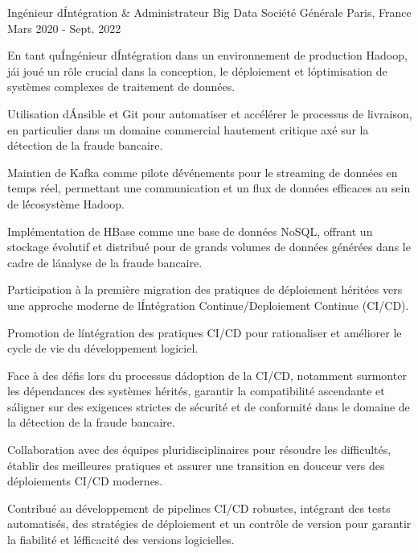 \begin{cventries}
  \cventry
    {Ingénieur d\' Intégration \& Administrateur Big Data} %
    {Société Générale} %
    {Paris, France} %
    {Mars 2020 - Sept. 2022} %
    {
      \begin{cvitems} %
        \item {En tant qu\' Ingénieur d\' Intégration dans un environnement de production Hadoop, j\' ai joué un rôle crucial dans la conception, le déploiement et l\' optimisation de systèmes complexes de traitement de données.}
        \item {Utilisation d\' Ansible et Git pour automatiser et accélérer le processus de livraison, en particulier dans un domaine commercial hautement critique axé sur la détection de la fraude bancaire.}
        \item {Maintien de Kafka comme pilote d\' événements pour le streaming de données en temps réel, permettant une communication et un flux de données efficaces au sein de l\' écosystème Hadoop.}
        \item {Implémentation de HBase comme une base de données NoSQL, offrant un stockage évolutif et distribué pour de grands volumes de données générées dans le cadre de l\' analyse de la fraude bancaire.}
        \item {Participation à la première migration des pratiques de déploiement héritées vers une approche moderne de l\' Intégration Continue/Deploiement Continue (CI/CD).}
        \item {Promotion de l\' intégration des pratiques CI/CD pour rationaliser et améliorer le cycle de vie du développement logiciel.}
        \item {Face à des défis lors du processus d\' adoption de la CI/CD, notamment surmonter les dépendances des systèmes hérités, garantir la compatibilité ascendante et s\' aligner sur des exigences strictes de sécurité et de conformité dans le domaine de la détection de la fraude bancaire.}
        \item {Collaboration avec des équipes pluridisciplinaires pour résoudre les difficultés, établir des meilleures pratiques et assurer une transition en douceur vers des déploiements CI/CD modernes.}
        \item {Contribué au développement de pipelines CI/CD robustes, intégrant des tests automatisés, des stratégies de déploiement et un contrôle de version pour garantir la fiabilité et l\' efficacité des versions logicielles.}
      \end{cvitems}
    }


\end{cventries}
